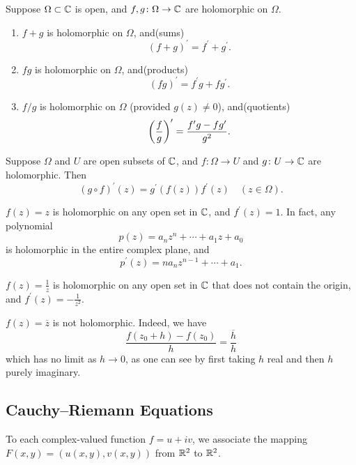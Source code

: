 \begin{lemma}
Suppose $\Omega\subset\mathbb C$ is open, and $f,g\colon\Omega\to\mathbb C$ are holomorphic on $\Omega$. 
\begin{enumerate}[label=(\roman*)]
\item $f+g$ is holomorphic on $\Omega$, and\hfill(sums)
\[(f+g)^\prime=f^\prime+g^\prime.\]
\item $fg$ is holomorphic on $\Omega$, and\hfill(products)
\[(fg)^\prime=f^\prime g+f g^\prime.\]
\item $f/g$ is holomorphic on $\Omega$ (provided $g(z)\neq0$), and\hfill(quotients)
\[\left(\frac{f}{g}\right)^\prime=\frac{f^\prime g-fg^\prime}{g^2}.\]
\end{enumerate}
\end{lemma}

\begin{lemma}
Suppose $\Omega$ and $U$ are open subsets of $\mathbb C$, and $f\colon\Omega\to U$ and $g\colon U\to\mathbb C$ are holomorphic. Then
\begin{equation}
(g\circ f)^\prime(z)=g^\prime(f(z))f^\prime(z)\quad(z\in\Omega).
\end{equation}
\end{lemma}

\begin{example}[Polynomials]
$f(z)=z$ is holomorphic on any open set in $\mathbb C$, and $f^\prime(z)=1$. In fact, any polynomial
\[p(z)=a_nz^n+\cdots+a_1z+a_0\]
is holomorphic in the entire complex plane, and
\[p^\prime(z)=na_nz^{n-1}+\cdots+a_1.\]
\end{example}

\begin{example}
$f(z)=\frac{1}{z}$ is holomorphic on any open set in $\mathbb C$ that does not contain the origin, and $f^\prime(z)=-\frac{1}{z^2}$.
\end{example}

\begin{example}
$f(z)=\overline{z}$ is not holomorphic. Indeed, we have
\[\frac{f(z_0+h)-f(z_0)}{h}=\frac{\overline{h}}{h}\]
which has no limit as $h\to 0$, as one can see by first taking $h$ real and then $h$ purely imaginary.
\end{example}

\subsection{Cauchy--Riemann Equations}
To each complex-valued function $f=u+iv$, we associate the mapping $F(x,y)=(u(x,y), v(x,y))$ from $\mathbb R^2$ to $\mathbb R^2$.


